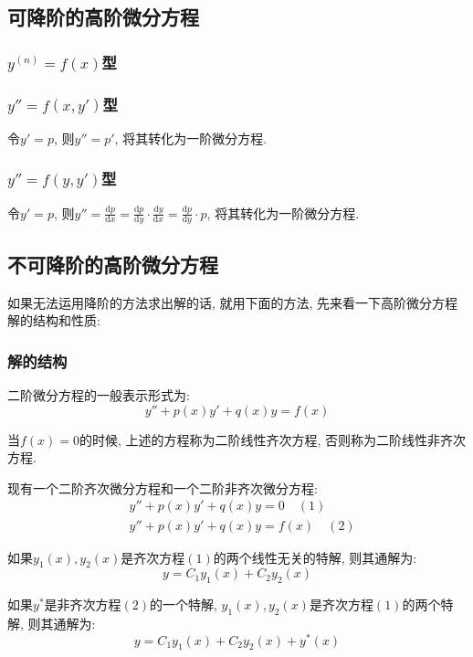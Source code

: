 \subsection{可降阶的高阶微分方程}
\subsubsection{$ y^{(n)}=f(x) $型}
\subsubsection{$ y''=f(x,y') $型}
令$ y'=p $, 则$ y''=p' $, 将其转化为一阶微分方程.
\subsubsection{$ y''=f(y,y') $型}
令$ y'=p $, 则$ y''=\frac{\mathrm{d}p}{\mathrm{d}x}=\frac{\mathrm{d}p}{\mathrm{d}y}\cdot \frac{\mathrm{d}y}{\mathrm{d}x}=\frac{\mathrm{d}p}{\mathrm{d}y}\cdot p $, 将其转化为一阶微分方程.
\subsection{不可降阶的高阶微分方程}
如果无法运用降阶的方法求出解的话, 就用下面的方法, 先来看一下高阶微分方程解的结构和性质:
\subsubsection{解的结构}
二阶微分方程的一般表示形式为:
\begin{equation*}
y''+p(x)y'+q(x)y=f(x)
\end{equation*}\par
当$ f(x)=0 $的时候, 上述的方程称为二阶线性齐次方程, 否则称为二阶线性非齐次方程.\par 现有一个二阶齐次微分方程和一个二阶非齐次微分方程:
\begin{equation*}
\begin{aligned}
& y''+p(x)y'+q(x)y=0 \quad (1) \\
& y''+p(x)y'+q(x)y=f(x) \quad (2)
\end{aligned}
\end{equation*}
\par \vspace{.5em}
如果$ y_{1}(x),y_{2}(x) $是齐次方程$ (1) $的两个线性无关的特解, 则其通解为:
\begin{equation*}
y=C_{1}y_{1}(x)+C_{2}y_{2}(x)
\end{equation*}
\par \vspace{.5em}
如果$ y^{*} $是非齐次方程$ (2) $的一个特解, $ y_{1}(x),y_{2}(x) $是齐次方程$ (1) $的两个特解, 则其通解为:
\begin{equation*}
y=C_{1}y_{1}(x)+C_{2}y_{2}(x)+y^{*}(x)
\end{equation*}
